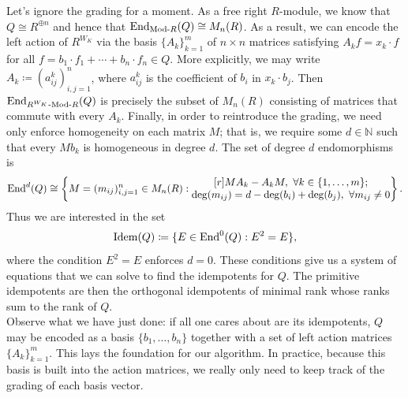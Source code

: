 \noindent Let's ignore the grading for a moment. As a free right $R$-module, we know that $Q \cong R^{\oplus n}$ and hence that $\textup{End}_{\textup{Mod-}R}(Q) \cong M_n(R)$. As a result, we can encode the left action of $R^{W_K}$ via the basis $\{A_k\}_{k=1}^m$ of $n\times n$ matrices satisfying $A_k f = x_k \cdot f$ for all $f = b_1\cdot f_1 + \cdots + b_n\cdot f_n \in Q$. More explicitly, we may write $A_k \coloneqq (a_{ij}^k)_{i,j=1}^n$, where $a_{ij}^k$ is the coefficient of $b_i$ in $x_k \cdot b_j$. Then $\textup{End}_{R^{W_K}\textup{-Mod-}R}(Q)$ is precisely the subset of $M_n(R)$ consisting of matrices that commute with every $A_k$. Finally, in order to reintroduce the grading, we need only enforce homogeneity on each matrix $M$; that is, we require some $d \in \mathbb{N}$ such that every $Mb_k$ is homogeneous in degree $d$. The set of degree $d$ endomorphisms is
\begin{align*}
\begin{split}
\textup{End}^d(Q) \cong \left\{M = (m_{ij})_{i,j=1}^n \in M_n(R) : \begin{matrix}[r]MA_k - A_kM,\ \forall k \in \{1, \dots, m\};\\\deg(m_{ij}) = d-\deg(b_i)+\deg(b_j),\ \forall m_{ij} \neq 0\end{matrix}\right\}.
\end{split}
\end{align*}
\noindent Thus we are interested in the set
\begin{align*}
\begin{split}
\textup{Idem}(Q) \coloneqq \{E \in \textup{End}^0(Q) : E^2 = E\},
\end{split}
\end{align*}
\noindent where the condition $E^2 = E$ enforces $d = 0$. These conditions give us a system of equations that we can solve to find the idempotents for $Q$. The primitive idempotents are then the orthogonal idempotents of minimal rank whose ranks sum to the rank of $Q$.\\

\noindent  Observe what we have just done: if all one cares about are its idempotents, $Q$ may be encoded as a basis $\{b_1, \dots, b_n\}$ together with a set of left action matrices $\{A_k\}_{k=1}^m$. This lays the foundation for our algorithm. In practice, because this basis is built into the action matrices, we really only need to keep track of the grading of each basis vector.\\

